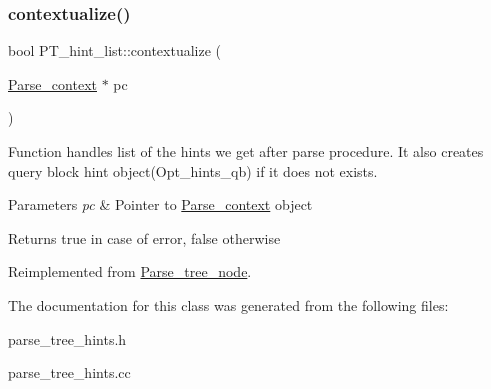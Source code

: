 \subsubsection{\texorpdfstring{contextualize()}{contextualize()}}
{\footnotesize\ttfamily bool P\+T\+\_\+hint\+\_\+list\+::contextualize (\begin{DoxyParamCaption}\item[{\mbox{\hyperlink{structParse__context}{Parse\+\_\+context}} $\ast$}]{pc }\end{DoxyParamCaption})\hspace{0.3cm}{\ttfamily [virtual]}}

Function handles list of the hints we get after parse procedure. It also creates query block hint object(\+Opt\+\_\+hints\+\_\+qb) if it does not exists.


\begin{DoxyParams}{Parameters}
{\em pc} & Pointer to \mbox{\hyperlink{structParse__context}{Parse\+\_\+context}} object\\
\hline
\end{DoxyParams}
\begin{DoxyReturn}{Returns}
true in case of error, false otherwise 
\end{DoxyReturn}


Reimplemented from \mbox{\hyperlink{classParse__tree__node_a22d93524a537d0df652d7efa144f23da}{Parse\+\_\+tree\+\_\+node}}.



The documentation for this class was generated from the following files\+:\begin{DoxyCompactItemize}
\item 
parse\+\_\+tree\+\_\+hints.\+h\item 
parse\+\_\+tree\+\_\+hints.\+cc\end{DoxyCompactItemize}
